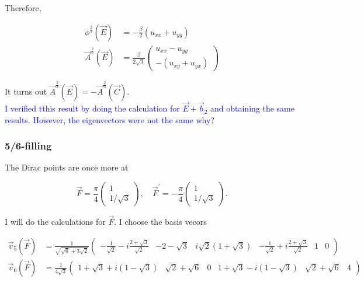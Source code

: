 \documentclass[../../../main.tex]{subfiles}
\begin{document}
Therefore,

\begin{align}
	\phi^{\frac23} (\vec{E}) &= -\frac{\beta}{2}(u_{xx} + u_{yy}) \\
	\vec{A}^{\frac23}(\vec{E}) &= \frac{\beta}{2\sqrt{3}}
	\begin{pmatrix}
		u_{xx}-u_{yy} \\
		-(u_{xy}+u_{yx})
	\end{pmatrix}
\end{align}

It turns out $\vec{A}^{\frac23}(\vec{E}) = -\vec{A}^{\frac23}(\vec{C})$. \\

\textcolor{blue}{I verified tthis result by doing the calculation for $\vec{E} + \vec{b}_2$ and obtaining the same results. However, the eigenvectors were not the same why?} 

\subsubsection{5/6-filling} 

The Dirac points are once more at 

\begin{equation}
	\vec{F} = \frac{\pi}{4}
	\begin{pmatrix}
		1 \\
		1/\sqrt{3}
	\end{pmatrix}, \quad 
	\vec{F}^\prime = -\frac{\pi}{4}
	\begin{pmatrix}
		1 \\
		1/\sqrt{3}
	\end{pmatrix}.
\end{equation}

I will do the calculations for $\vec{F}$. I choose the basis vecors

\begin{align}
	\vec{v}_5(\vec{F}) &= \frac{1}{\sqrt{\sqrt{6}+3\sqrt{2}}}
	\begin{pmatrix}
		-\frac{1}{\sqrt{2}} -i\frac{2+\sqrt{3}}{\sqrt{2}} & -2-\sqrt{3} & i\sqrt{2}(1+\sqrt{3}) & -\frac{1}{\sqrt{2}} + i \frac{2+\sqrt{3}}{\sqrt{2}} & 1 & 0
	\end{pmatrix} \\
	\vec{v}_6(\vec{F}) &= \frac{1}{4\sqrt{3}}
	\begin{pmatrix}
		1+\sqrt{3} + i(1-\sqrt{3}) & \sqrt{2} + \sqrt{6} & 0 & 1+\sqrt{3} -i (1-\sqrt{3}) & \sqrt{2} + \sqrt{6} & 4
	\end{pmatrix}
\end{align}
\end{document}
